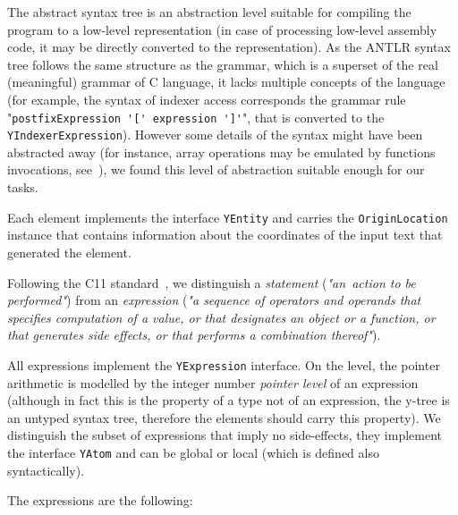 The abstract syntax tree \ytree{} is an abstraction level suitable for compiling the program to a low-level representation (in case of processing low-level assembly code, it may be directly converted to the \xgraph{} representation).
As the ANTLR syntax tree follows the same structure as the grammar, which is a superset of the real (meaningful) grammar of C language, it lacks multiple concepts of the language (for example, the syntax of indexer access corresponds the grammar rule "\lstinline{postfixExpression '[' expression ']'}", that is converted to the \texttt{YIndexerExpression}).
However some details of the syntax might have been abstracted away (for instance, array operations may be emulated by functions invocations, see~\cite[Chapter 5]{gries2012science}), we found this level of abstraction suitable enough for our tasks.

Each \ytree{} element implements the interface \texttt{YEntity} and carries the \texttt{OriginLocation} %
instance that contains information about the coordinates of the input text that generated the \ytree{} element.

Following the C11 standard~\cite{iso2012iec}, we distinguish a \textit{statement} (\textit{"an~action to be performed"}) from an \textit{expression} (\textit{"a sequence of operators and operands that specifies computation of a value, or that designates an object or a function, or that generates side effects, or that performs a combination thereof"}).

All \ytree{} expressions implement the \texttt{YExpression} interface.
On the \ytree{} level, the pointer arithmetic is modelled by the integer number \textit{pointer level} of an expression (although in fact this is the property of a type not of an expression, the y-tree is an untyped syntax tree, therefore the elements \ytree{} should carry this property).
We distinguish the subset of expressions that imply no side-effects, they implement the interface \texttt{YAtom} and can be global or local (which is defined also syntactically).

\vspace{1em}
The \ytree{} expressions are the following:


